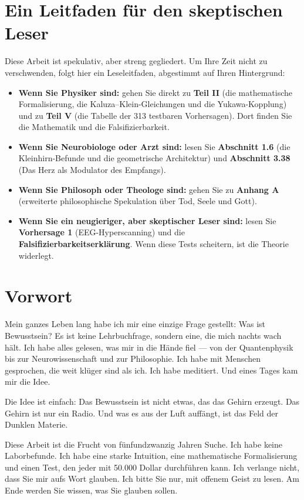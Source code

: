 \documentclass[11pt,a4paper]{article}
\begin{document}
\section*{Ein Leitfaden für den skeptischen Leser}
Diese Arbeit ist spekulativ, aber streng gegliedert. Um Ihre Zeit nicht zu verschwenden, folgt hier ein Leseleitfaden, abgestimmt auf Ihren Hintergrund:
\begin{itemize}
    \item \textbf{Wenn Sie Physiker sind:} gehen Sie direkt zu \textbf{Teil II} (die mathematische Formalisierung, die Kaluza--Klein-Gleichungen und die Yukawa-Kopplung) und zu \textbf{Teil V} (die Tabelle der 313 testbaren Vorhersagen). Dort finden Sie die Mathematik und die Falsifizierbarkeit.
    \item \textbf{Wenn Sie Neurobiologe oder Arzt sind:} lesen Sie \textbf{Abschnitt 1.6} (die Kleinhirn-Befunde und die geometrische Architektur) und \textbf{Abschnitt 3.38} (Das Herz als Modulator des Empfangs).
    \item \textbf{Wenn Sie Philosoph oder Theologe sind:} gehen Sie zu \textbf{Anhang A} (erweiterte philosophische Spekulation über Tod, Seele und Gott).
    \item \textbf{Wenn Sie ein neugieriger, aber skeptischer Leser sind:} lesen Sie \textbf{Vorhersage 1} (EEG-Hyperscanning) und die \textbf{Falsifizierbarkeitserklärung}. Wenn diese Tests scheitern, ist die Theorie widerlegt.
\end{itemize}

\section*{Vorwort}
Mein ganzes Leben lang habe ich mir eine einzige Frage gestellt: Was ist Bewusstsein? Es ist keine Lehrbuchfrage, sondern eine, die mich nachts wach hält. Ich habe alles gelesen, was mir in die Hände fiel --- von der Quantenphysik bis zur Neurowissenschaft und zur Philosophie. Ich habe mit Menschen gesprochen, die weit klüger sind als ich. Ich habe meditiert. Und eines Tages kam mir die Idee.

Die Idee ist einfach: Das Bewusstsein ist nicht etwas, das das Gehirn erzeugt. Das Gehirn ist nur ein Radio. Und was es aus der Luft auffängt, ist das Feld der Dunklen Materie.

Diese Arbeit ist die Frucht von fünfundzwanzig Jahren Suche. Ich habe keine Laborbefunde. Ich habe eine starke Intuition, eine mathematische Formalisierung und einen Test, den jeder mit 50.000 Dollar durchführen kann. Ich verlange nicht, dass Sie mir aufs Wort glauben. Ich bitte Sie nur, mit offenem Geist zu lesen. Am Ende werden Sie wissen, was Sie glauben sollen.
\end{document}
